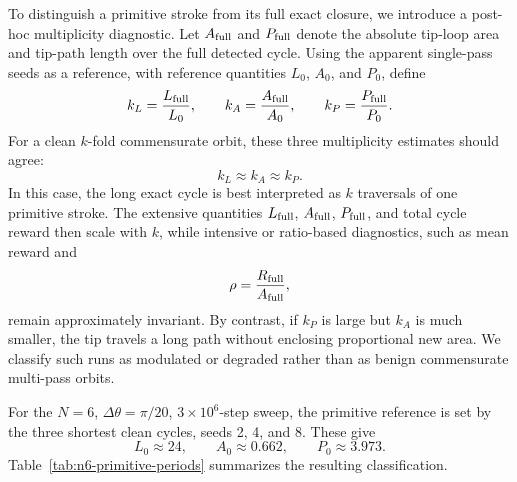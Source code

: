 \documentclass[11pt]{article}
\begin{document}
To distinguish a primitive stroke from its full exact closure, we introduce a post-hoc multiplicity diagnostic. Let $A_{\rm full}$ and $P_{\rm full}$ denote the absolute tip-loop area and tip-path length over the full detected cycle. Using the apparent single-pass seeds as a reference, with reference quantities $L_0$, $A_0$, and $P_0$, define
\begin{equation}
k_L = \frac{L_{\rm full}}{L_0},
\qquad
k_A = \frac{A_{\rm full}}{A_0},
\qquad
k_P = \frac{P_{\rm full}}{P_0}.
\end{equation}
For a clean $k$-fold commensurate orbit, these three multiplicity estimates should agree:
\begin{equation}
k_L \approx k_A \approx k_P.
\end{equation}
In this case, the long exact cycle is best interpreted as $k$ traversals of one primitive stroke. The extensive quantities $L_{\rm full}$, $A_{\rm full}$, $P_{\rm full}$, and total cycle reward then scale with $k$, while intensive or ratio-based diagnostics, such as mean reward and
\begin{equation}
\rho = \frac{R_{\rm full}}{A_{\rm full}},
\end{equation}
remain approximately invariant. By contrast, if $k_P$ is large but $k_A$ is much smaller, the tip travels a long path without enclosing proportional new area. We classify such runs as modulated or degraded rather than as benign commensurate multi-pass orbits.

For the $N=6$, $\Delta\theta=\pi/20$, $3\times 10^6$-step sweep, the primitive reference is set by the three shortest clean cycles, seeds 2, 4, and 8. These give
\[
L_0 \approx 24,
\qquad
A_0 \approx 0.662,
\qquad
P_0 \approx 3.973.
\]
Table~\ref{tab:n6-primitive-periods} summarizes the resulting classification.
\end{document}

